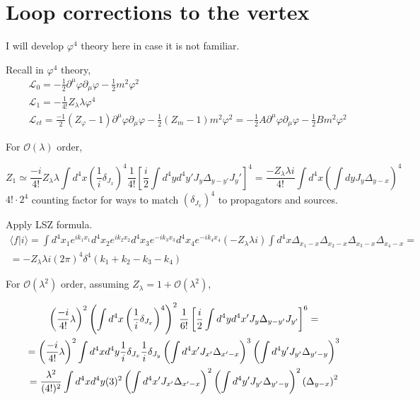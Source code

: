 \documentclass[twoside]{amsart}
\newcommand{\solutionhead}[1]
  {\smallskip
   \noindent{\large\bf Solution #1.}
   }
\begin{document}







\section{Loop corrections to the vertex}

\solutionhead{16.1} 

I will develop $\varphi^4$ theory here in case it is not familiar.  

Recall in $\varphi^4$ theory,
\[
\begin{aligned}
  & \mathcal{L}_0 = - \frac{1}{2} \partial^{\mu} \varphi \partial_{\mu} \varphi - \frac{1}{2} m^2 \varphi^2 \\ 
  & \mathcal{L}_1 = - \frac{1}{4!} Z_{\lambda} \lambda \varphi^4 \\ 
  & \mathcal{L}_{ct} =  \frac{-1}{2} (Z_{\varphi}- 1) \partial^{\mu} \varphi \partial_{\mu} \varphi - \frac{1}{2} ( Z_m - 1) m^2 \varphi^2 = -\frac{1}{2} A \partial^{\mu} \varphi \partial_{\mu} \varphi - \frac{1}{2} Bm^2 \varphi^2
\end{aligned}
\]

For $\mathcal{O}(\lambda)$ order,

\[
Z_1 \simeq \frac{-i}{4!} Z_{\lambda} \lambda \int d^4x \left( \frac{1}{i} \delta_{J_x} \right)^4 \frac{1}{4!} \left[ \frac{i}{2} \int d^4y d^4y' J_y \Delta_{y-y'} J_y' \right]^4 = \frac{-Z_{\lambda} \lambda i }{ 4!} \int d^4x \left( \int dy J_y \Delta_{y-x} \right)^4
\]
$4! \cdot 2^4$ counting factor for ways to match $(\delta_{J_x})^4$ to propagators and sources.  

Apply LSZ formula.  
\[
\begin{gathered}
  \langle f | i \rangle   = \int d^4x_1 e^{ik_1 x_1} d^4x_2 e^{ i k_2 x_2} d^4x_3 e^{ -i k_3 x_3} d^4x_4 e^{ -i k_4 x_4} (-Z_{\lambda} \lambda i ) \int d^4x \Delta_{x_1- x} \Delta_{x_2 - x} \Delta_{x_3 - x} \Delta_{x_4 - x} = \\ 
  = -Z_{\lambda} \lambda i (2\pi)^4 \delta^4(k_1 + k_2 - k_3 - k_4)
\end{gathered}
\]

For $\mathcal{O}(\lambda^2)$ order, assuming $Z_{\lambda} = 1 + \mathcal{O}(\lambda^2)$,

\begin{gather}
  \left( \frac{ -i}{4!} \lambda \right)^2 \left( \int d^4x \left( \frac{1}{i} \delta_{J_x} \right)^4 \right)^2 \frac{1}{6!} \left[ \frac{i}{2} \int d^4y d^4x' J_y \Delta_{y-y'} J_{y'} \right]^6 = \notag \\
  = \left( \frac{ -i}{4!} \lambda \right)^2 \int d^4x d^4y \frac{1}{i} \delta_{J_x} \frac{1}{i} \delta_{J_y} \left( \int d^4x' J_{x'} \Delta_{x'-x} \right)^3 \left( \int d^4y' J_{y'}  \Delta_{y'-y} \right)^3     \label{Eq:phi4theory-counting01} \\
  = \frac{ \lambda^2}{(4!)^2} \int d^4x d^4y (3)^2 \left( \int d^4x' J_{x'} \Delta_{x'-x} \right)^2 \left( \int d^4y' J_{y'} \Delta_{y' - y} \right)^2 \left( \Delta_{y-x} \right)^2  \label{Eq:phi4theory-counting02}
\end{gather}
  
\end{document}
